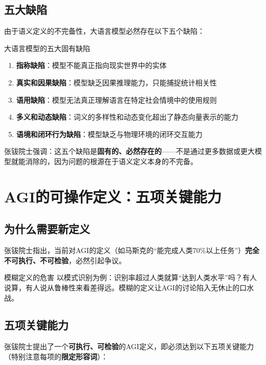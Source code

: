 \documentclass[a4paper]{article}
\begin{document}
\subsection{五大缺陷}

由于语义定义的不完备性，大语言模型必然存在以下五个缺陷：

\begin{importantbox}{大语言模型的五大固有缺陷}
\begin{enumerate}
\item \textbf{指称缺陷}：模型不能真正指向现实世界中的实体
\item \textbf{真实和因果缺陷}：模型缺乏因果推理能力，只能捕捉统计相关性
\item \textbf{语用缺陷}：模型无法真正理解语言在特定社会情境中的使用规则
\item \textbf{多义和动态缺陷}：词义的多样性和动态变化超出了静态向量表示的能力
\item \textbf{语境和闭环行为缺陷}：模型缺乏与物理环境的闭环交互能力
\end{enumerate}
\end{importantbox}

张钹院士强调：这五个缺陷是\textbf{固有的、必然存在的}——不是通过更多数据或更大模型就能消除的，因为问题的根源在于语义定义本身的不完备。


\section{AGI的可操作定义：五项关键能力}

\subsection{为什么需要新定义}

张钹院士指出，当前对AGI的定义（如马斯克的``能完成人类70\%以上任务''）\textbf{完全不可执行、不可检验}，必然引起争议。

\begin{warningbox}{模糊定义的危害}
以模式识别为例：识别率超过人类就算``达到人类水平''吗？有人说算，有人说从鲁棒性来看差得远。模糊的定义让AGI的讨论陷入无休止的口水战。
\end{warningbox}

\subsection{五项关键能力}

张钹院士提出了一个\textbf{可执行、可检验}的AGI定义，即必须达到以下五项关键能力（特别注意每项的\textbf{限定形容词}）：
\end{document}
